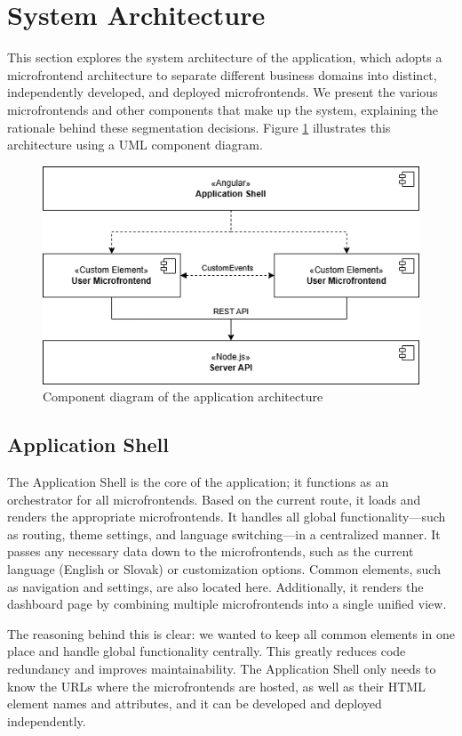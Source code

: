 \section{System Architecture}
\label{sec:SystemArchitecture}
This section explores the system architecture of the application, which adopts a microfrontend architecture to separate different business domains into distinct, independently developed, and deployed microfrontends. We present the various microfrontends and other components that make up the system, explaining the rationale behind these segmentation decisions. Figure \ref{fig:app-architecture} illustrates this architecture using a UML component diagram.
\begin{figure}[h]  
    \centerline{\includegraphics[width=.75\textwidth]{images/app-architecture.png}}  
    \caption[Application architecture component diagram]{Component diagram of the application architecture}  
    \label{fig:app-architecture}  
\end{figure}

\subsection{Application Shell}
The Application Shell is the core of the application; it functions as an orchestrator for all microfrontends. Based on the current route, it loads and renders the appropriate microfrontends. It handles all global functionality—such as routing, theme settings, and language switching—in a centralized manner. It passes any necessary data down to the microfrontends, such as the current language (English or Slovak) or customization options. Common elements, such as navigation and settings, are also located here. Additionally, it renders the dashboard page by combining multiple microfrontends into a single unified view.

The reasoning behind this is clear: we wanted to keep all common elements in one place and handle global functionality centrally. This greatly reduces code redundancy and improves maintainability. The Application Shell only needs to know the URLs where the microfrontends are hosted, as well as their HTML element names and attributes, and it can be developed and deployed independently.


